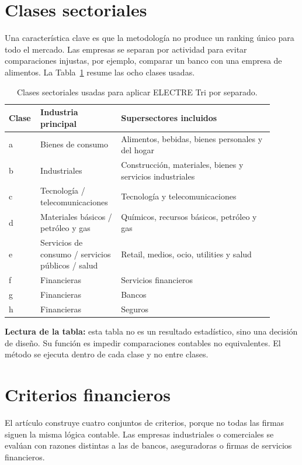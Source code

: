 \documentclass[11pt,a4paper]{article}
\begin{document}
\section{Clases sectoriales}

Una característica clave es que la metodología no produce un ranking único para todo el mercado. Las empresas se separan por actividad para evitar comparaciones injustas, por ejemplo, comparar un banco con una empresa de alimentos. La Tabla~\ref{tab:clases} resume las ocho clases usadas.

\begin{table}[h!]
\centering
\caption{Clases sectoriales usadas para aplicar ELECTRE Tri por separado.}
\label{tab:clases}
\begin{tabular}{p{0.08\linewidth}p{0.28\linewidth}p{0.54\linewidth}}
\toprule
Clase & Industria principal & Supersectores incluidos \\
\midrule
a & Bienes de consumo & Alimentos, bebidas, bienes personales y del hogar \\
b & Industriales & Construcción, materiales, bienes y servicios industriales \\
c & Tecnología / telecomunicaciones & Tecnología y telecomunicaciones \\
d & Materiales básicos / petróleo y gas & Químicos, recursos básicos, petróleo y gas \\
e & Servicios de consumo / servicios públicos / salud & Retail, medios, ocio, utilities y salud \\
f & Financieras & Servicios financieros \\
g & Financieras & Bancos \\
h & Financieras & Seguros \\
\bottomrule
\end{tabular}
\end{table}

\textbf{Lectura de la tabla:} esta tabla no es un resultado estadístico, sino una decisión de diseño. Su función es impedir comparaciones contables no equivalentes. El método se ejecuta dentro de cada clase y no entre clases.

\section{Criterios financieros}

El artículo construye cuatro conjuntos de criterios, porque no todas las firmas siguen la misma lógica contable. Las empresas industriales o comerciales se evalúan con razones distintas a las de bancos, aseguradoras o firmas de servicios financieros.
\end{document}
